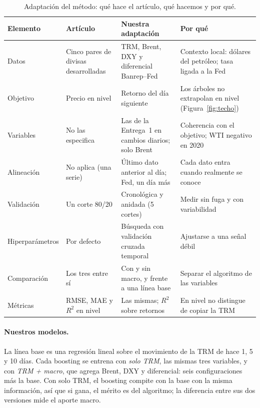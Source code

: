 \documentclass[11pt,letterpaper]{article}
\begin{document}
\begin{table}[!htbp]
\centering\footnotesize
\setlength{\tabcolsep}{4pt}
\renewcommand{\arraystretch}{0.95}
\caption{Adaptación del método: qué hace el artículo, qué hacemos y por qué.}
\label{tab:adaptacion}
\begin{tabular}{l>{\raggedright\arraybackslash}p{3.3cm}>{\raggedright\arraybackslash}p{4.5cm}>{\raggedright\arraybackslash}p{4.9cm}}
\toprule
Elemento & Artículo & Nuestra adaptación & Por qué \\
\midrule
Datos & Cinco pares de divisas desarrolladas & TRM, Brent, DXY y diferencial Banrep--Fed & Contexto local: dólares del petróleo; tasa ligada a la Fed \\
Objetivo & Precio en nivel & Retorno del día siguiente & Los árboles no extrapolan en nivel (Figura~\ref{fig:techo}) \\
Variables & No las especifica & Las de la Entrega~1 en cambios diarios; solo Brent & Coherencia con el objetivo; WTI negativo en 2020 \\
Alineación & No aplica (una serie) & Último dato anterior al día; Fed, un día más & Cada dato entra cuando realmente se conoce \\
Validación & Un corte 80/20 & Cronológica y anidada (5 cortes) & Medir sin fuga y con variabilidad \\
Hiperparámetros & Por defecto & Búsqueda con validación cruzada temporal & Ajustarse a una señal débil \\
Comparación & Los tres entre sí & Con y sin macro, y frente a una línea base & Separar el algoritmo de las variables \\
Métricas & RMSE, MAE y $R^2$ en nivel & Las mismas; $R^2$ sobre retornos & En nivel no distingue de copiar la TRM \\
\bottomrule
\end{tabular}
\end{table}

\paragraph{Nuestros modelos.} La línea base es una regresión lineal sobre el movimiento de la TRM de hace 1, 5 y 10 días. Cada boosting se entrena con \emph{solo TRM}, las mismas tres variables, y con \emph{TRM + macro}, que agrega Brent, DXY y diferencial: seis configuraciones más la base. Con solo TRM, el boosting compite con la base con la misma información, así que si gana, el mérito es del algoritmo; la diferencia entre sus dos versiones mide el aporte macro.
\end{document}
